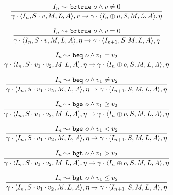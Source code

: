 \documentclass[declaration,shortabstract,english,mgr]{iithesis}
\newcommand{\mstate}[5] {
	\langle#1, #2, #3, #4, #5\rangle
}
\newcommand{\ipointsto}[3] {
	#1 \leadsto \texttt{#2} \text{ } #3
}
\begin{document}
\begin{equation}
\label{eq:semantics_brtrue1}
	\infer{
		\gamma \cdot \mstate{I_n}{S \cdot v}{M}{L}{A}, \eta
			\rightarrow
		\gamma \cdot \mstate{I_{n} \oplus o}{S}{M}{L}{A}, \eta
	}
	{\ipointsto{I_n}{brtrue}{o} \land v \neq 0}
\end{equation}

\begin{equation}
\label{eq:semantics_brtrue2}
	\infer{
		\gamma \cdot \mstate{I_n}{S \cdot v}{M}{L}{A}, \eta
			\rightarrow
		\gamma \cdot \mstate{I_{n+1}}{S}{M}{L}{A}, \eta
	}
	{\ipointsto{I_n}{brtrue}{o} \land v = 0}
\end{equation}

\begin{equation}
\label{eq:semantics_beq1}
	\infer{
		\gamma \cdot \mstate{I_n}{S \cdot v_1 \cdot v_2}{M}{L}{A}, \eta
			\rightarrow
		\gamma \cdot \mstate{I_{n} \oplus o}{S}{M}{L}{A}, \eta
	}
	{\ipointsto{I_n}{beq}{o} \land v_1 = v_2}
\end{equation}

\begin{equation}
\label{eq:semantics_beq2}
	\infer{
		\gamma \cdot \mstate{I_n}{S \cdot v_1 \cdot v_2}{M}{L}{A}, \eta
			\rightarrow
		\gamma \cdot \mstate{I_{n+1}}{S}{M}{L}{A}, \eta
	}
	{\ipointsto{I_n}{beq}{o} \land v_1 \neq v_2}
\end{equation}

\begin{equation}
\label{eq:semantics_bge1}
	\infer{
		\gamma \cdot \mstate{I_n}{S \cdot v_1 \cdot v_2}{M}{L}{A}, \eta
			\rightarrow
		\gamma \cdot \mstate{I_{n} \oplus o}{S}{M}{L}{A}, \eta
	}
	{\ipointsto{I_n}{bge}{o} \land v_1 \geq v_2}
\end{equation}

\begin{equation}
\label{eq:semantics_bge2}
	\infer{
		\gamma \cdot \mstate{I_n}{S \cdot v_1 \cdot v_2}{M}{L}{A}, \eta
			\rightarrow
		\gamma \cdot \mstate{I_{n+1}}{S}{M}{L}{A}, \eta
	}
	{\ipointsto{I_n}{bge}{o} \land v_1 < v_2}
\end{equation}

\begin{equation}
\label{eq:semantics_bgt1}
	\infer{
		\gamma \cdot \mstate{I_n}{S \cdot v_1 \cdot v_2}{M}{L}{A}, \eta
			\rightarrow
		\gamma \cdot \mstate{I_{n} \oplus o}{S}{M}{L}{A}, \eta
	}
	{\ipointsto{I_n}{bgt}{o} \land v_1 > v_2}
\end{equation}

\begin{equation}
\label{eq:semantics_bgt2}
	\infer{
		\gamma \cdot \mstate{I_n}{S \cdot v_1 \cdot v_2}{M}{L}{A}, \eta
			\rightarrow
		\gamma \cdot \mstate{I_{n+1}}{S}{M}{L}{A}, \eta
	}
	{\ipointsto{I_n}{bgt}{o} \land v_1 \leq v_2}
\end{equation}
\end{document}
